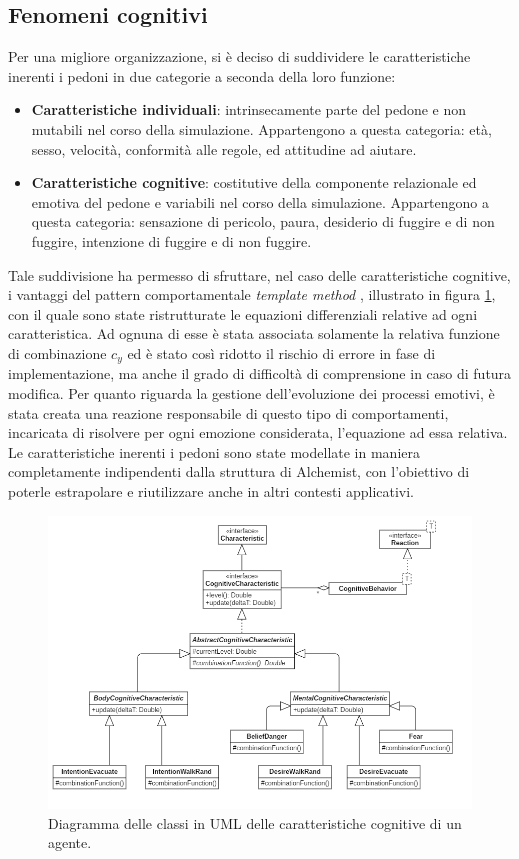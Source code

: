 \subsection{Fenomeni cognitivi}
Per una migliore organizzazione, si è deciso di suddividere le caratteristiche inerenti i pedoni in due categorie a seconda della loro funzione:
\begin{itemize}
    \item \textbf{Caratteristiche individuali}: intrinsecamente parte del pedone e non mutabili nel corso della simulazione. Appartengono a questa categoria: età, sesso, velocità, conformità alle regole, ed attitudine ad aiutare.
    \item \textbf{Caratteristiche cognitive}: costitutive della componente relazionale ed emotiva del pedone e variabili nel corso della simulazione. Appartengono a questa categoria: sensazione di pericolo, paura, desiderio di fuggire e di non fuggire, intenzione di fuggire e di non fuggire.
\end{itemize}
Tale suddivisione ha permesso di sfruttare, nel caso delle caratteristiche cognitive, i vantaggi del pattern comportamentale \textit{template method} \cite{GoF1995}, illustrato in figura \ref{fig:cognitive-characteristics-uml}, con il quale sono state ristrutturate le equazioni differenziali relative ad ogni caratteristica. Ad ognuna di esse è stata associata solamente la relativa funzione di combinazione $c_{y}$ ed è stato così ridotto il rischio di errore in fase di implementazione, ma anche il grado di difficoltà di comprensione in caso di futura modifica. \newline
Per quanto riguarda la gestione dell'evoluzione dei processi emotivi, è stata creata una reazione responsabile di questo tipo di comportamenti, incaricata di risolvere per ogni emozione considerata, l'equazione ad essa relativa. \newline
Le caratteristiche inerenti i pedoni sono state modellate in maniera completamente indipendenti dalla struttura di Alchemist, con l'obiettivo di poterle estrapolare e riutilizzare anche in altri contesti applicativi.

\begin{figure}[ht]
  \centering
  \includegraphics[width=0.8\linewidth]{immagini/uml/cognitive-characteristics.png}
  \caption{Diagramma delle classi in UML delle caratteristiche cognitive di un agente.}
  \label{fig:cognitive-characteristics-uml}
\end{figure}

